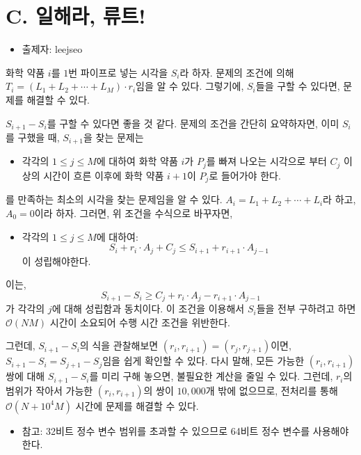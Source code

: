 \documentclass{article}
\begin{document}
	\newpage
	\section{C. 일해라, 류트!}
	
	\begin{itemize}
		\item 출제자: leejseo
	\end{itemize}
	
	화학 약품 $i$를 $1$번 파이프로 넣는 시각을 $S_i$라 하자. 문제의 조건에 의해 $T_i=(L_1+L_2+\cdots+L_M) \cdot r_i$임을 알 수 있다. 그렇기에, $S_i$들을 구할 수 있다면, 문제를 해결할 수 있다.\newline
	
	$S_{i+1}-S_i$를 구할 수 있다면 좋을 것 같다. 문제의 조건을 간단히 요약하자면, 이미 $S_i$를 구했을 때, $S_{i+1}$을 찾는 문제는
	\begin{itemize}
		\item 각각의 $1 \le j \le M$에 대하여 화학 약품 $i$가 $P_j$를 빠져 나오는 시각으로 부터 $C_j$ 이상의 시간이 흐른 이후에 화학 약품 $i+1$이 $P_j$로 들어가야 한다.
	\end{itemize}
	를 만족하는 최소의 시각을 찾는 문제임을 알 수 있다. $A_i = L_1+L_2+\cdots+L_i$라 하고, $A_0 = 0$이라 하자. 그러면, 위 조건을 수식으로 바꾸자면,
	\begin{itemize}
		\item 각각의 $1 \le j \le M$에 대하여:
		$$ S_i + r_i \cdot A_j + C_j \le S_{i+1} + r_{i+1} \cdot A_{j-1} $$
		이 성립해야한다.
	\end{itemize}
	이는, $$S_{i+1} - S_i \ge  C_j + r_i \cdot A_j - r_{i+1} \cdot A_{j-1}$$가 각각의 $j$에 대해 성립함과 동치이다. 이 조건을 이용해서 $S_i$들을 전부 구하려고 하면 $\mathcal{O}(NM)$ 시간이 소요되어 수행 시간 조건을 위반한다.\newline
	
	그런데, $S_{i+1}-S_i$의 식을 관찰해보면 $(r_i, r_{i+1}) = (r_j, r_{j+1})$이면, $S_{i+1} - S_i = S_{j+1} - S_j$임을 쉽게 확인할 수 있다. 다시 말해, 모든 가능한 $(r_i, r_{i+1})$ 쌍에 대해 $S_{i+1}-S_i$를 미리 구해 놓으면, 불필요한 계산을 줄일 수 있다. 그런데, $r_i$의 범위가 작아서 가능한 $(r_i, r_{i+1})$의 쌍이 $10,000$개 밖에 없으므로, 전처리를 통해 $\mathcal{O}(N + 10^4M)$ 시간에 문제를 해결할 수 있다.
	
	\begin{itemize}
		\item 참고: 32비트 정수 변수 범위를 초과할 수 있으므로 64비트 정수 변수를 사용해야 한다.
	\end{itemize}
\end{document}
